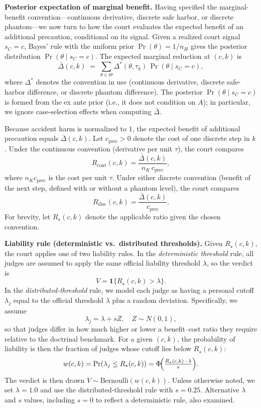 \documentclass{article}
\begin{document}
\medskip
\noindent\textbf{Posterior expectation of marginal benefit.}
Having specified the marginal-benefit convention—continuous derivative, discrete safe harbor, or discrete phantom—we now turn to how the court evaluates the expected benefit of an additional precaution, conditional on its signal. Given a realized court signal $s_C=c$, Bayes’ rule with the uniform prior $\Pr(\theta)=1/n_H$ gives the posterior distribution $\Pr(\theta \mid s_C=c)$. The expected marginal reduction at $(c,k)$ is
\[
\bar{\Delta}(c,k)\;=\;\sum_{\theta\in\Theta}\Delta^{*}(\theta,\tau_k)\,\Pr(\theta\mid s_C=c),
\]
where $\Delta^{*}$ denotes the convention in use (continuous derivative, discrete safe-harbor difference, or discrete phantom difference). The posterior $\Pr(\theta\mid s_C=c)$ is formed from the ex ante prior (i.e., it does not condition on $A$); in particular, we ignore case-selection effects when computing $\bar{\Delta}$.

Because accident harm is normalized to $1$, the expected benefit of additional precaution equals $\bar{\Delta}(c,k)$. Let $c_{\mathrm{prec}}>0$ denote the cost of one discrete step in $k$. Under the continuous convention (derivative per unit $\tau$), the court compares
\[
R_{\mathrm{cont}}(c,k)=\frac{\bar{\Delta}(c,k)}{\,n_K\,c_{\mathrm{prec}}\,},
\]
where $n_K c_{\mathrm{prec}}$ is the cost per unit $\tau$. Under either discrete convention (benefit of the next step, defined with or without a phantom level), the court compares
\[
R_{\mathrm{disc}}(c,k)=\frac{\bar{\Delta}(c,k)}{\,c_{\mathrm{prec}}\,}.
\]
For brevity, let $R_\star(c,k)$ denote the applicable ratio given the chosen convention.

\medskip
\noindent\textbf{Liability rule (deterministic vs.\ distributed thresholds).}
Given $R_\star(c,k)$, the court applies one of two liability rules. In the \emph{deterministic threshold} rule, all judges are assumed to apply the same official liability threshold $\lambda$, so the verdict is
\[
V=\mathbf{1}\!\{R_\star(c,k)>\lambda\}.
\]
In the \emph{distributed-threshold} rule, we model each judge as having a personal cutoff $\lambda_j$ equal to the official threshold $\lambda$ plus a random deviation. Specifically, we assume
\[
\lambda_j = \lambda + sZ, \quad Z\sim N(0,1),
\]
so that judges differ in how much higher or lower a benefit–cost ratio they require relative to the doctrinal benchmark. For a given $(c,k)$, the probability of liability is then the fraction of judges whose cutoff lies below $R_\star(c,k)$:
\[
w(c,k)=\Pr(\lambda_j \leq R_\star(c,k))=\Phi\!\Bigl(\tfrac{R_\star(c,k)-\lambda}{s}\Bigr).
\]
The verdict is then drawn $V\sim \mathrm{Bernoulli}(w(c,k))$. Unless otherwise noted, we set $\lambda=1.0$ and use the distributed-threshold rule with $s=0.25$. Alternative $\lambda$ and $s$ values, including $s=0$ to reflect a deterministic rule, also examined.
\end{document}
